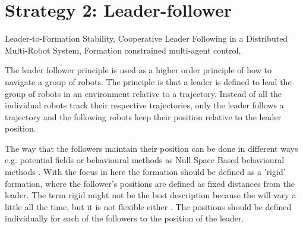 \section{Strategy 2: Leader-follower}
Leader-to-Formation Stability,
Cooperative Leader Following in a Distributed Multi-Robot System,
Formation constrained multi-agent control, 

The leader follower principle is used as a higher order principle of how to navigate a group of robots. The principle is that a leader is defined to lead the group of robots in an environment relative to a trajectory. Instead of all the individual robots track their respective trajectories, only the leader follows a trajectory and the following robots keep their position relative to the leader position.

The way that the followers maintain their position can be done in different ways e.g. potential fields \citep{pfmrm} or behavioural methods as Null Space Based behavioural methods \citep{arrichiello2006formation}. With the focus in here the formation should be defined as a 'rigid' formation, where the follower's positions are defined as fixed distances from the leader. The term rigid might not be the best description because the will vary a little all the time, but it is not flexible either \citep{976029}.
The positions should be defined individually for each of the followers to the position of the leader.